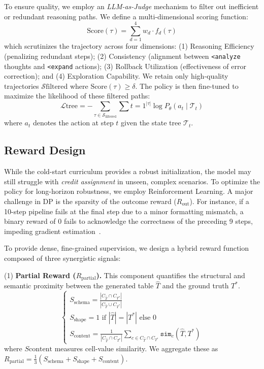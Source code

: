 To ensure quality, we employ an \textit{LLM-as-Judge} mechanism to filter out inefficient or redundant reasoning paths. We define a multi-dimensional scoring function:
\begin{equation}
\text{Score}(\tau) = \sum_{d=1}^{4} w_d \cdot f_d(\tau)
\end{equation}
which scrutinizes the trajectory across four dimensions:
(1) {Reasoning Efficiency} (penalizing redundant steps);
(2) {Consistency} (alignment between \texttt{<analyze} thoughts and \texttt{<expand} actions);
(3) {Rollback Utilization} (effectiveness of error correction); and
(4) {Exploration Capability}.
We retain only high-quality trajectories $\mathcal{S}{\text{filtered}}$ where $\text{Score}(\tau) \geq \delta$. The policy is then fine-tuned to maximize the likelihood of these filtered paths:
\begin{equation}
\mathcal{L}{\text{tree}} = -\sum_{\tau \in \mathcal{S}_{\text{filtered}}} \sum{t=1}^{|\tau|} \log P_\theta(a_t \mid \mathcal{T}_t)
\end{equation}
where $a_t$ denotes the action at step $t$ given the state tree $\mathcal{T}_t$.

\subsection{Reward Design}
\label{subsec:rl}

While the cold-start curriculum provides a robust initialization, the model may still struggle with \textit{credit assignment} in unseen, complex scenarios. To optimize the policy for long-horizon robustness, we employ Reinforcement Learning.
A major challenge in DP is the sparsity of the outcome reward ($R_{\text{out}}$). For instance, if a 10-step pipeline fails at the final step due to a minor formatting mismatch, a binary reward of $0$ fails to acknowledge the correctness of the preceding 9 steps, impeding gradient estimation~\cite{lyu2025sql}.

To provide dense, fine-grained supervision, we design a hybrid reward function composed of three synergistic signals:

\noindent (1) \textbf{Partial Reward ($R_{\text{partial}}$).} This component quantifies the structural and semantic proximity between the generated table $\hat{T}$ and the ground truth $T^*$.
\begin{equation}
\begin{cases}
S_{\text{schema}} = \frac{|C_{\hat{T}} \cap C_{T^*}|}{|C_{\hat{T}} \cup C_{T^*}|} \\
S_{\text{shape}} = 1 \text{ if } |\hat{T}| = |T^*| \text{ else } 0 \\
S_{\text{content}} = \frac{1}{|C_{\hat{T}} \cap C_{T^*}|} \sum_{c \in C_{\hat{T}} \cap C_{T^*}} \mathtt{sim}_c(\hat{T}, T^*)
\end{cases}
\end{equation}
where $S{\text{content}}$ measures cell-value similarity. We aggregate these as $R_{\text{partial}} = \frac{1}{3} (S_{\text{schema}} + S_{\text{shape}} + S_{\text{content}})$.

